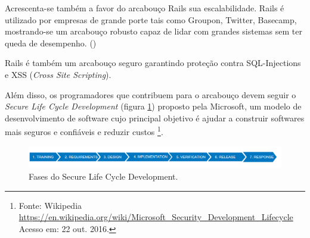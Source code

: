 \par Acrescenta-se também a favor do arcabouço Rails sua escalabilidade. Rails é utilizado por empresas de grande porte tais como Groupon, Twitter, Basecamp, mostrando-se um arcabouço robusto capaz de lidar com grandes sistemas sem ter queda de desempenho. (\citep{lilia:16})
\par Rails é também um arcabouço seguro garantindo proteção contra SQL-Injections e XSS (\emph{Cross Site Scripting}).
\par Além disso, os programadores que contribuem para o arcabouço devem seguir o \emph{Secure Life Cycle Development} (figura \ref{fig:security_dev_lifecycle}) proposto pela Microsoft, um modelo de desenvolvimento de software cujo principal objetivo é ajudar a construir softwares mais seguros e confiáveis e reduzir custos \footnote{Fonte: Wikipedia \url{https://en.wikipedia.org/wiki/Microsoft_Security_Development_Lifecycle} Acesso em: 22 out. 2016.}.
\begin{figure}[htb]
\centering
\includegraphics[width=15cm]{figuras/security_dev_lifecycle}
\caption{\label{fig:security_dev_lifecycle} Fases do Secure Life Cycle Development.}
\end{figure}
